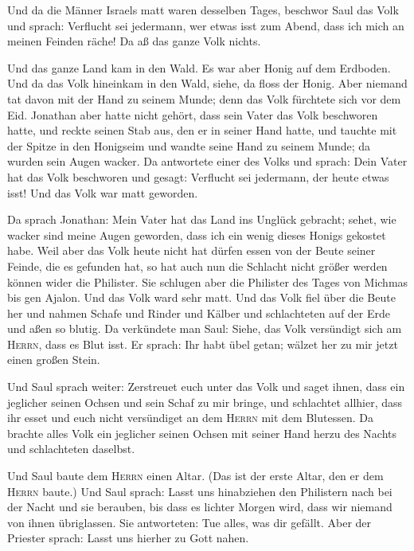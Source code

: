  Und da die Männer Israels matt waren desselben Tages,
beschwor Saul das Volk und sprach: Verflucht sei jedermann, wer etwas
isst zum Abend, dass ich mich an meinen Feinden räche! Da aß das ganze
Volk nichts.

 Und das ganze Land kam in den Wald. Es war aber Honig
auf dem Erdboden.  Und da das Volk hineinkam in den Wald,
siehe, da floss der Honig. Aber niemand tat davon mit der Hand zu seinem
Munde; denn das Volk fürchtete sich vor dem Eid. 
Jonathan aber hatte nicht gehört, dass sein Vater das Volk beschworen
hatte, und reckte seinen Stab aus, den er in seiner Hand hatte, und
tauchte mit der Spitze in den Honigseim und wandte seine Hand zu seinem
Munde; da wurden sein Augen wacker.  Da antwortete einer
des Volks und sprach: Dein Vater hat das Volk beschworen und gesagt:
Verflucht sei jedermann, der heute etwas isst! Und das Volk war matt
geworden.

 Da sprach Jonathan: Mein Vater hat das Land ins Unglück
gebracht; sehet, wie wacker sind meine Augen geworden, dass ich ein
wenig dieses Honigs gekostet habe.  Weil aber das Volk
heute nicht hat dürfen essen von der Beute seiner Feinde, die es
gefunden hat, so hat auch nun die Schlacht nicht größer werden können
wider die Philister.  Sie schlugen aber die Philister des
Tages von Michmas bis gen Ajalon. Und das Volk ward sehr matt.
 Und das Volk fiel über die Beute her und nahmen Schafe
und Rinder und Kälber und schlachteten auf der Erde und aßen so blutig.
 Da verkündete man Saul: Siehe, das Volk versündigt sich
am \textsc{Herrn}, dass es Blut isst. Er sprach: Ihr habt übel getan;
wälzet her zu mir jetzt einen großen Stein.

 Und Saul sprach weiter: Zerstreuet euch unter das Volk
und saget ihnen, dass ein jeglicher seinen Ochsen und sein Schaf zu mir
bringe, und schlachtet allhier, dass ihr esset und euch nicht
versündiget an dem \textsc{Herrn} mit dem Blutessen. Da brachte alles
Volk ein jeglicher seinen Ochsen mit seiner Hand herzu des Nachts und
schlachteten daselbst.

 Und Saul baute dem \textsc{Herrn} einen Altar. (Das ist
der erste Altar, den er dem \textsc{Herrn} baute.)  Und
Saul sprach: Lasst uns hinabziehen den Philistern nach bei der Nacht und
sie berauben, bis dass es lichter Morgen wird, dass wir niemand von
ihnen übriglassen. Sie antworteten: Tue alles, was dir gefällt. Aber der
Priester sprach: Lasst uns hierher zu Gott nahen.

